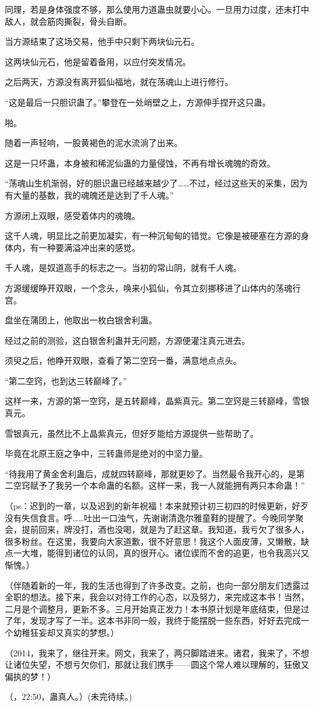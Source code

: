 \begin{this_body}
同理，若是身体强度不够，那么使用力道蛊虫就要小心。一旦用力过度，还未打中敌人，就会筋肉撕裂，骨头自断。

当方源结束了这场交易，他手中只剩下两块仙元石。

这两块仙元石，他是留着备用，以应付突发情况。

之后两天，方源没有离开狐仙福地，就在荡魂山上进行修行。

“这是最后一只胆识蛊了。”攀登在一处峭壁之上，方源伸手捏开这只蛊。

啪。

随着一声轻响，一股黄褐色的泥水流淌了出来。

这是一只坏蛊，本身被和稀泥仙蛊的力量侵蚀，不再有增长魂魄的奇效。

“荡魂山生机渐弱，好的胆识蛊已经越来越少了……不过，经过这些天的采集，因为有大量的基数，我的魂魄还是达到了千人魂。”

方源闭上双眼，感受着体内的魂魄。

这千人魂，明显比之前更加凝实，有一种沉甸甸的错觉。它像是被硬塞在方源的身体内，有一种要满溢冲出来的感觉。

千人魂，是奴道高手的标志之一。当初的常山阴，就有千人魂。

方源缓缓睁开双眼，一个念头，唤来小狐仙，令其立刻挪移进了山体内的荡魂行宫。

盘坐在蒲团上，他取出一枚白银舍利蛊。

经过之前的测验，这白银舍利蛊并无问题，方源便灌注真元进去。

须臾之后，他睁开双眼，查看了第二空窍一番，满意地点点头。

“第二空窍，也到达三转巅峰了。”

这样一来，方源的第一空窍，是五转巅峰，晶紫真元。第二空窍是三转巅峰，雪银真元。

雪银真元，虽然比不上晶紫真元，但好歹能给方源提供一些帮助了。

毕竟在北原王庭之争中，三转蛊师是绝对的中坚力量。

“待我用了黄金舍利蛊后，成就四转巅峰，那就更妙了。当然最令我开心的，是第二空窍赋予了我另一个本命蛊的名额。这样一来，我一人就能拥有两只本命蛊！”

（ps：迟到的一章，以及迟到的新年祝福！本来就预计初三初四的时候更新，好歹没有失信食言。呼……吐出一口浊气，先谢谢清逸尔雅童鞋的提醒了。今晚同学聚会，提前回来，牌没打，酒也没喝，就是为了赶这章。我知道，我亏欠了很多人，很多粉丝。在这里，我要向大家道歉，很不好意思！我这个人面皮薄，又懒散，缺点一大堆，能得到诸位的认同，真的很开心。诸位锲而不舍的追更，也令我高兴又惭愧。）

（伴随着新的一年，我的生活也得到了许多改变。之前，也向一部分朋友们透露过全职的想法。接下来，我会以对待工作的心态，以及努力，来完成这本书！当然，二月是个调整月，更新不多。三月开始真正发力！本书原计划是年底结束，但是过了年，发现才写了一半。这本书非同一般，我终于能摆脱一些东西，好好去完成一个幼稚狂妄却又真实的梦想。）

（2014，我来了，继往开来。网文，我来了，两只脚踏进来。诸君，我来了，不想让诸位失望，不想亏欠你们，那就让我们携手——圆这个常人难以理解的，狂傲又偏执的梦！）

（，22:50，蛊真人。）(未完待续。)

\end{this_body}

